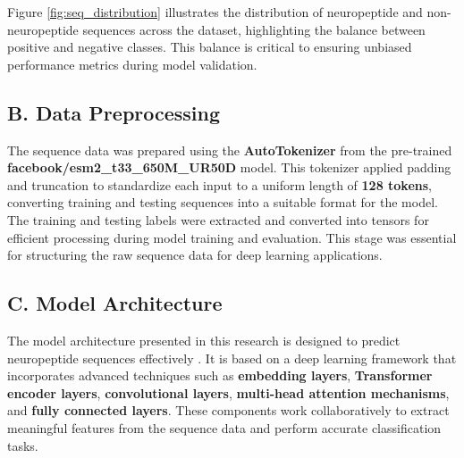 \documentclass[conference]{IEEEtran}
\begin{document}
Figure \ref{fig:seq_distribution} illustrates the distribution of neuropeptide and non-neuropeptide sequences across the dataset, highlighting the balance between positive and negative classes. This balance is critical to ensuring unbiased performance metrics during model validation.


\subsection*{B. Data Preprocessing}

The sequence data was prepared using the \textbf{AutoTokenizer} from the pre-trained \textbf{facebook/esm2\_t33\_650M\_UR50D} model. This tokenizer applied padding and truncation to standardize each input to a uniform length of \textbf{128 tokens}, converting training and testing sequences into a suitable format for the model. The training and testing labels were extracted and converted into tensors for efficient processing during model training and evaluation. This stage was essential for structuring the raw sequence data for deep learning applications.

\subsection*{C. Model Architecture}
The model architecture presented in this research is designed to predict neuropeptide sequences effectively \cite{wang2023}. It is based on a deep learning framework that incorporates advanced techniques such as \textbf{embedding layers}, \textbf{Transformer encoder layers}, \textbf{convolutional layers}, \textbf{multi-head attention mechanisms}, and \textbf{fully connected layers}. These components work collaboratively to extract meaningful features from the sequence data and perform accurate classification tasks.

\vspace{-1.4em}
    
\end{document}
